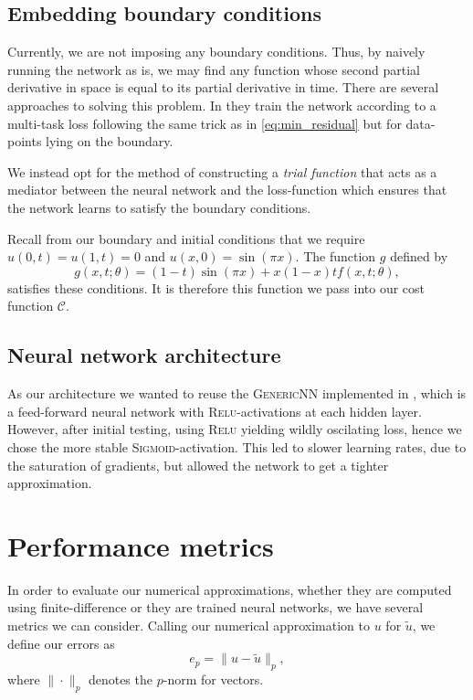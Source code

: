\documentclass[article, a4paper, oneside]{memoir}
\newcommand{\cost}{\mathcal{C}}
\begin{document}
	\subsection{Embedding boundary conditions}

	Currently, we are not imposing any boundary conditions. Thus, by
	naively running the network as is, we may find any function whose
	second partial derivative in space is equal to its partial derivative
	in time. There are several approaches to solving this problem. In
	\cite{luDeepXDEDeepLearning2019} they train the network according to a
	multi-task loss following the same trick as in \cref{eq:min_residual}
	but for data-points lying on the boundary.
	
	We instead opt for the method of constructing a \emph{trial function}
	that acts as a mediator between the neural network and the
	loss-function which ensures that the network learns to satisfy the
	boundary conditions.

	Recall from our boundary and initial conditions that we require \( u(0,
	t) = u(1, t) = 0 \) and \( u(x, 0) = \sin(\pi x) \). The function \( g
	\) defined by
	\begin{equation}
		\label{eq:trial}
		g(x, t; \theta) = (1 - t) \sin(\pi x) + x(1-x)t f(x, t; \theta),
	\end{equation}
	satisfies these conditions. It is therefore this function we pass into
	our cost function \( \cost \).
	
	\subsection{Neural network architecture}

	As our architecture we wanted to reuse the \textsc{GenericNN}
	implemented in \cite{stangebyFYSSTK4155Project2019a}, which is a
	feed-forward neural network with \textsc{Relu}-activations at each
	hidden layer. However, after initial testing, using \textsc{Relu}
	yielding wildly oscilating loss, hence we chose the more stable
	\textsc{Sigmoid}-activation. This led to slower learning rates, due to
	the saturation of gradients, but allowed the network to get a tighter
	approximation.
	
	\section{Performance metrics}
	
	In order to evaluate our numerical approximations, whether they are
	computed using finite-difference or they are trained neural networks,
	we have several metrics we can consider. Calling our numerical
	approximation to \( u \) for \( \tilde{u} \), we define our errors as
	\begin{equation}
		e_p = \| u - \tilde{u} \|_p,
	\end{equation}
	where \( \| \cdot \|_p \) denotes the \(p\)-norm for vectors.
\end{document}
